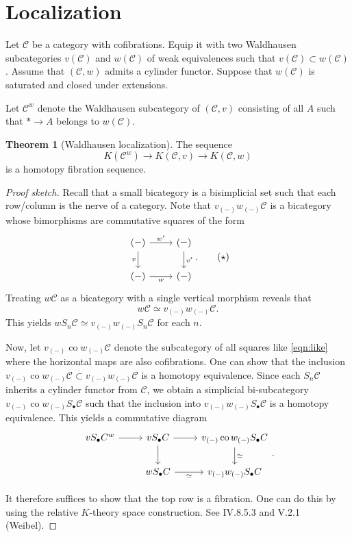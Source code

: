 \documentclass[10pt,letterpaper,cm]{nupset}
\theoremstyle{definition}
\theoremstyle{theorem}
\newtheorem{theorem}[definition]{Theorem}
\theoremstyle{remark}
\newcommand{\1}{\mathbf{1}}
\renewcommand{\c}{\mathscr{C}}
\newcommand{\0}{\vec 0}
\DeclareMathOperator{\co}{co}
\begin{document}
\section{Localization}

Let $\c$ be a category with cofibrations. Equip it with two Waldhausen subcategories $v(\c)$ and $w(\c)$ of weak equivalences such that $v(\c) \subset w(\c)$. Assume that $\left(\c, w\right)$ admits a cylinder functor. Suppose that $w(\c)$ is saturated and closed under extensions. 

\smallskip


Let $\c^w$ denote the Waldhausen subcategory of $\left(\c, v\right)$ consisting of all $A$ such that $\ast \to A$ belongs to $w(\c)$.

\begin{theorem}[Waldhausen localization]\label{local}
The sequence $$ K(\c^w) \to K(\c, v) \to K(\c, w) $$ is a homotopy fibration sequence.
\end{theorem}
\begin{proof}[Proof sketch]
Recall that a small bicategory is a bisimplicial set such that each row/column is the nerve of a category. Note that $v_{(-)}w_{(-)}\c$ is a bicategory whose bimorphisms are commutative squares of the form
\[ \label{eqn:like}
\begin{tikzcd}
(-) \arrow[r, "w'"] \arrow[d, "v"'] & (-) \arrow[d, "v'"] \\
(-) \arrow[r, "w"'] & (-)
\end{tikzcd}. \tag{$\star$}
\]
Treating $w \c$ as a bicategory with a single vertical morphism reveals that $$w \c \simeq v_{(-)}w_{(-)}\c.$$This yields  $wS_n \c \simeq v_{(-)}w_{(-)}S_n\c$ for each $n$.

\medskip

 Now, let $v_{(-)}\co w_{(-)}\c$ denote the subcategory of all squares like \eqref{eqn:like} where the horizontal maps are also cofibrations. One can show that the inclusion $v_{(-)}\co w_{(-)}\c \subset v_{(-)}w_{(-)}\c$ is a homotopy equivalence. Since each $S_n \c$ inherits a cylinder functor from $\c$, we obtain a simplicial bi-subcategory $v_{(-)}\co w_{(-)}S_{\bullet}\c$ such that the inclusion into $v_{(-)}w_{(-)}S_{\bullet}\c$ is a homotopy equivalence. This yields a commutative diagram
\[
\begin{tikzcd}
vS_{\bullet}C^w \arrow[r] & vS_{\bullet}C \arrow[r] \arrow[d] & v_{(-)}\co w_{(-)}S_{\bullet}C \arrow[d, "\simeq"] \\
 & wS_{\bullet}C \arrow[r, "\simeq"'] & v_{(-)}w_{(-)}S_{\bullet}C
\end{tikzcd}.
\]

\medskip

 It therefore suffices to show that the top row is a fibration. One can do this by using the relative $K$-theory space construction. See IV.8.5.3 and V.2.1 (Weibel).
\end{proof}
\end{document}
